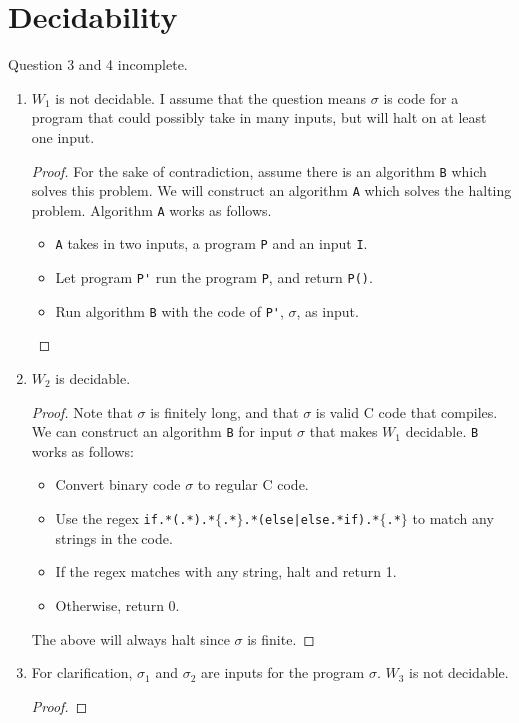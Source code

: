 \documentclass[12pt]{article}
\newcommand{\code}{\lstinline}
\begin{document}
\section{Decidability}
Question 3 and 4 incomplete.
\begin{enumerate}
    \item $W_1$ is not decidable. I assume that the question means $\sigma$ is code for a program that could possibly take in many inputs, but will halt on at least one input.
    \begin{proof}
        For the sake of contradiction, assume there is an algorithm \code{B} which solves this problem. We will construct an algorithm \code{A} which solves the halting problem. Algorithm \code{A} works as follows.
        \begin{itemize}
            \item \code{A} takes in two inputs, a program \code{P} and an input \code{I}.
            \item Let program \code{P'} run the program \code{P}, and return \code{P()}.
            \item Run algorithm \code{B} with the code of \code{P'}, $\sigma$, as input.
        \end{itemize}
    \end{proof}
    \item $W_2$ is decidable. 
    \begin{proof}
        Note that $\sigma$ is finitely long, and that $\sigma$ is valid C code that compiles. We can construct an algorithm \code{B} for input $\sigma$ that makes $W_1$ decidable. \code{B} works as follows:
        \begin{itemize}
            \item Convert binary code $\sigma$ to regular C code.
            \item Use the regex \code{if.*(.*).*}$\{$\code{.*}$\}$\code{.*(else|else.*if).*}$\{$\code{.*}$\}$ to match any strings in the code.
            \item If the regex matches with any string, halt and return 1.
            \item Otherwise, return 0.
        \end{itemize}
        The above will always halt since $\sigma$ is finite.
    \end{proof}
    \item For clarification, $\sigma_1$ and $\sigma_2$ are inputs for the program $\sigma$. $W_3$ is not decidable.
    \begin{proof}

\end{proof}
\end{enumerate}
\end{document}
